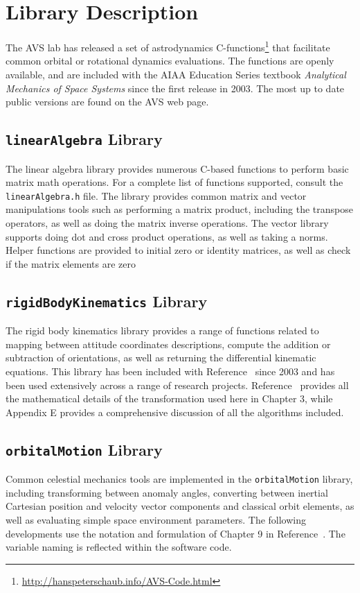 



\section{Library Description}
The AVS lab has released a set of astrodynamics C-functions\footnote{\url{http://hanspeterschaub.info/AVS-Code.html}} that facilitate common orbital or rotational dynamics evaluations.  The functions are openly available, and are included with the AIAA Education Series textbook \emph{Analytical Mechanics of Space Systems}\cite{schaub} since the first release in 2003.  The most up to date public versions are found on the AVS web page.

\subsection{{\tt linearAlgebra} Library}
The linear algebra library provides numerous C-based functions to perform basic matrix math operations.  For a complete list of functions supported, consult the {\tt linearAlgebra.h} file.   The library provides common matrix and vector manipulations tools such as performing a matrix product, including the transpose operators, as well as doing the matrix inverse operations.  The vector library supports doing dot and cross product operations, as well as taking a norms.  Helper functions are provided to initial zero or identity matrices, as well as check if the matrix elements are zero





\subsection{{\tt rigidBodyKinematics} Library}
The rigid body kinematics library provides a range of functions related to mapping between attitude coordinates descriptions, compute the addition or subtraction of orientations, as well as returning the differential kinematic equations.  This library has been included with Reference~ since 2003 and has been used extensively across a range of research projects.  Reference~ provides all the mathematical details of the transformation used here in Chapter 3, while Appendix E provides a comprehensive discussion of all the algorithms included.



\subsection{{\tt orbitalMotion} Library}
Common celestial mechanics tools are implemented in the {\tt orbitalMotion} library, including transforming between anomaly angles, converting between inertial Cartesian position and velocity vector components and classical orbit elements, as well as evaluating simple space environment parameters.  The following developments use the notation and formulation of Chapter 9 in Reference~.  The variable naming is reflected within the software code.  


